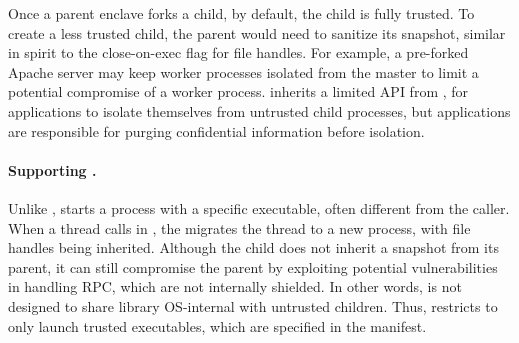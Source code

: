 


Once a parent enclave forks a child, by default, the child is fully trusted.
To create a less trusted child, the parent would need to sanitize its snapshot,
similar in spirit to the close-on-exec flag for file handles.
For example, a pre-forked Apache server may keep worker
processes isolated from the master %
to limit a potential compromise of a worker process. %
\graphenesgx{} inherits a limited API from \graphene{}, 
for applications to 
isolate themselves from untrusted child processes,
but applications are responsible for purging confidential information
before isolation.

\paragraph{Supporting .}

Unlike ,  
starts a process with a specific executable, often different from the caller.
When a thread calls  in \graphenesgx{},
the \libos{} migrates the thread to a new process,
with file handles being inherited.
Although the child does not inherit a snapshot from its parent,
it can still compromise the parent 
by exploiting potential vulnerabilities in handling RPC, 
which are not internally shielded.
In other words, \graphenesgx{} is not designed to share library OS-internal
with untrusted children.
Thus, \graphenesgx{} restricts  to only launch trusted executables, which are
specified in the manifest.


